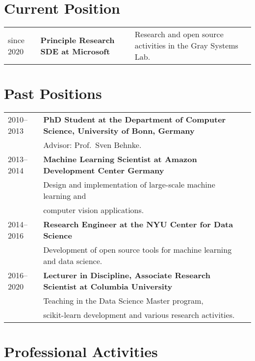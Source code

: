 \documentclass[a4paper,9pt]{article}
\begin{document}
\maketitle

\section{Current Position}
\begin{tabular}{lll}
    since 2020 & \textbf{Principle Research SDE at Microsoft}
               & Research and open source activities in the Gray Systems Lab.
\end{tabular}

\section{Past Positions}
\begin{tabular}{lll}
    2010--2013 & \textbf{PhD Student at the Department of Computer Science, University of Bonn, Germany}\\
         & Advisor: Prof.\ Sven Behnke. \\
    2013--2014 & \textbf{Machine Learning Scientist at Amazon Development Center Germany}\\
              & Design and implementation of large-scale machine learning and\\
              & computer vision applications.\\
    2014--2016 & \textbf{Research Engineer at the NYU Center for Data Science}\\
               & Development of open source tools for machine learning and data science.\\
    2016--2020 & \textbf{Lecturer in Discipline, Associate Research Scientist at Columbia University}\\
               & Teaching in the Data Science Master program, \\
               & scikit-learn development and various research activities.
\end{tabular}

\section{Professional Activities}
\end{document}

